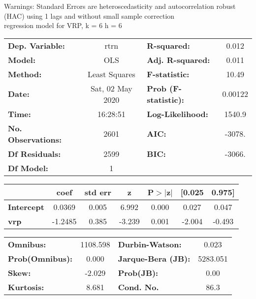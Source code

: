 Warnings: \newline
 [1] Standard Errors are heteroscedasticity and autocorrelation robust (HAC) using 1 lags and without small sample correction\\ 

regression model for VRP, k = 6 h = 6\begin{center}
\begin{tabular}{lclc}
\toprule
\textbf{Dep. Variable:}    &       rtrn       & \textbf{  R-squared:         } &     0.012   \\
\textbf{Model:}            &       OLS        & \textbf{  Adj. R-squared:    } &     0.011   \\
\textbf{Method:}           &  Least Squares   & \textbf{  F-statistic:       } &     10.49   \\
\textbf{Date:}             & Sat, 02 May 2020 & \textbf{  Prob (F-statistic):} &  0.00122    \\
\textbf{Time:}             &     16:28:51     & \textbf{  Log-Likelihood:    } &    1540.9   \\
\textbf{No. Observations:} &        2601      & \textbf{  AIC:               } &    -3078.   \\
\textbf{Df Residuals:}     &        2599      & \textbf{  BIC:               } &    -3066.   \\
\textbf{Df Model:}         &           1      & \textbf{                     } &             \\
\bottomrule
\end{tabular}
\begin{tabular}{lcccccc}
                   & \textbf{coef} & \textbf{std err} & \textbf{z} & \textbf{P$> |$z$|$} & \textbf{[0.025} & \textbf{0.975]}  \\
\midrule
\textbf{Intercept} &       0.0369  &        0.005     &     6.992  &         0.000        &        0.027    &        0.047     \\
\textbf{vrp}       &      -1.2485  &        0.385     &    -3.239  &         0.001        &       -2.004    &       -0.493     \\
\bottomrule
\end{tabular}
\begin{tabular}{lclc}
\textbf{Omnibus:}       & 1108.598 & \textbf{  Durbin-Watson:     } &    0.023  \\
\textbf{Prob(Omnibus):} &   0.000  & \textbf{  Jarque-Bera (JB):  } & 5283.051  \\
\textbf{Skew:}          &  -2.029  & \textbf{  Prob(JB):          } &     0.00  \\
\textbf{Kurtosis:}      &   8.681  & \textbf{  Cond. No.          } &     86.3  \\
\bottomrule
\end{tabular}
\end{center}

